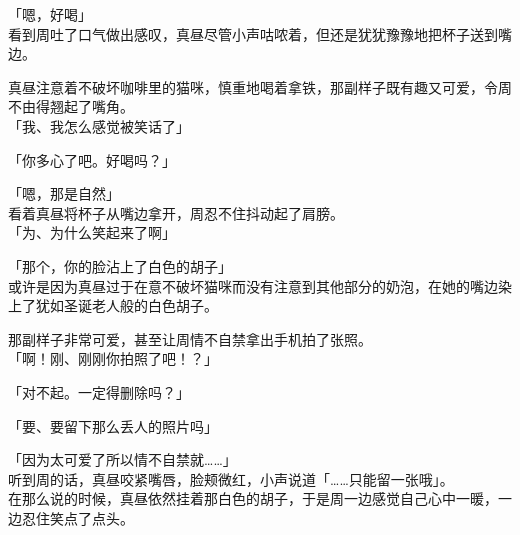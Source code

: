 「嗯，好喝」\\

看到周吐了口气做出感叹，真昼尽管小声咕哝着，但还是犹犹豫豫地把杯子送到嘴边。

真昼注意着不破坏咖啡里的猫咪，慎重地喝着拿铁，那副样子既有趣又可爱，令周不由得翘起了嘴角。\\

「我、我怎么感觉被笑话了」

「你多心了吧。好喝吗？」

「嗯，那是自然」\\

看着真昼将杯子从嘴边拿开，周忍不住抖动起了肩膀。\\

「为、为什么笑起来了啊」

「那个，你的脸沾上了白色的胡子」\\

或许是因为真昼过于在意不破坏猫咪而没有注意到其他部分的奶泡，在她的嘴边染上了犹如圣诞老人般的白色胡子。

那副样子非常可爱，甚至让周情不自禁拿出手机拍了张照。\\

「啊！刚、刚刚你拍照了吧！？」

「对不起。一定得删除吗？」

「要、要留下那么丢人的照片吗」

「因为太可爱了所以情不自禁就……」\\

听到周的话，真昼咬紧嘴唇，脸颊微红，小声说道「……只能留一张哦」。\\

在那么说的时候，真昼依然挂着那白色的胡子，于是周一边感觉自己心中一暖，一边忍住笑点了点头。
